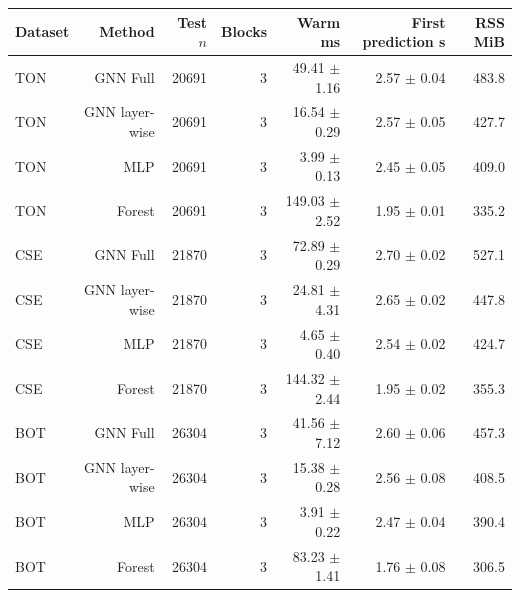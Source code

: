 \begin{tabular}{lrrrrrr}
\toprule
Dataset & Method & Test $n$ & Blocks & Warm ms & First prediction s & RSS MiB \\
\midrule
TON & GNN Full & 20691 & 3 & 49.41 $\pm$ 1.16 & 2.57 $\pm$ 0.04 & 483.8 \\
TON & GNN layer-wise & 20691 & 3 & 16.54 $\pm$ 0.29 & 2.57 $\pm$ 0.05 & 427.7 \\
TON & MLP & 20691 & 3 & 3.99 $\pm$ 0.13 & 2.45 $\pm$ 0.05 & 409.0 \\
TON & Forest & 20691 & 3 & 149.03 $\pm$ 2.52 & 1.95 $\pm$ 0.01 & 335.2 \\
CSE & GNN Full & 21870 & 3 & 72.89 $\pm$ 0.29 & 2.70 $\pm$ 0.02 & 527.1 \\
CSE & GNN layer-wise & 21870 & 3 & 24.81 $\pm$ 4.31 & 2.65 $\pm$ 0.02 & 447.8 \\
CSE & MLP & 21870 & 3 & 4.65 $\pm$ 0.40 & 2.54 $\pm$ 0.02 & 424.7 \\
CSE & Forest & 21870 & 3 & 144.32 $\pm$ 2.44 & 1.95 $\pm$ 0.02 & 355.3 \\
BOT & GNN Full & 26304 & 3 & 41.56 $\pm$ 7.12 & 2.60 $\pm$ 0.06 & 457.3 \\
BOT & GNN layer-wise & 26304 & 3 & 15.38 $\pm$ 0.28 & 2.56 $\pm$ 0.08 & 408.5 \\
BOT & MLP & 26304 & 3 & 3.91 $\pm$ 0.22 & 2.47 $\pm$ 0.04 & 390.4 \\
BOT & Forest & 26304 & 3 & 83.23 $\pm$ 1.41 & 1.76 $\pm$ 0.08 & 306.5 \\
\bottomrule
\end{tabular}
